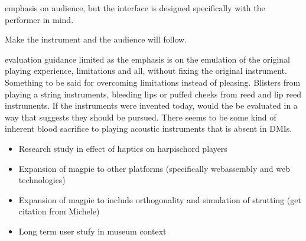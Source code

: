 emphasis on audience, but the interface is designed specifically with the performer in mind.

Make the instrument and the audience will follow.

evaluation guidance limited as the emphasis is on the emulation of the original playing experience, limitations and all, without fixing the original instrument. Something to be said for overcoming limitations instead of pleasing.
Blisters from playing a string instruments, bleeding lips or puffed cheeks from reed and lip reed instruments.
If the instruments were invented today, would the be evaluated in a way that suggests they should be pursued. There seems to be some kind of inherent blood sacrifice to playing acoustic instruments that is absent in DMIs.



\begin{itemize}
    \item Research study in effect of haptics on harpischord players
    \item Expansion of magpie to other platforms (specifically webassembly and web technologies)
    \item Expansion of magpie to include orthogonality and simulation of strutting (get citation from Michele)
    \item Long term user stufy in museum context 
\end{itemize}

